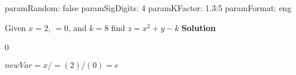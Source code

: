 paramRandom: false
paramSigDigits: 4
paramKFactor: 1.3:5
paramFormat: eng


\question Given \mbox{$x = 2$}, \mbox{$ = 0$}, and \mbox{$k = 8$} find $z = x^2+y-k$
\textbf{Solution}
\\ 

0

\mbox{$newVar = x/  =  (2)/(0) = e$}

